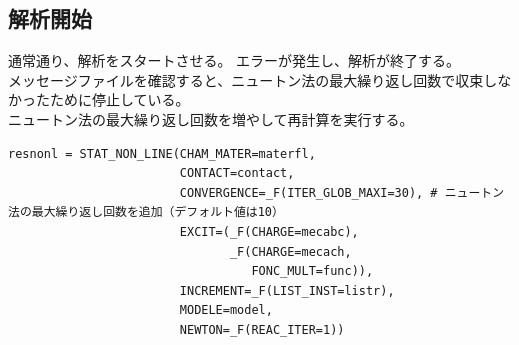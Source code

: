 \documentclass[a4j,11pt,twoside,openany,dvipdfmx]{jsarticle}
\begin{document}
\subsection{解析開始}
通常通り、解析をスタートさせる。
エラーが発生し、解析が終了する。\\
メッセージファイルを確認すると、ニュートン法の最大繰り返し回数で収束しなかったために停止している。\\
ニュートン法の最大繰り返し回数を増やして再計算を実行する。
\begin{lstlisting}[caption=非線形解析を修正,label=STAT_NON_LINE2]
resnonl = STAT_NON_LINE(CHAM_MATER=materfl,
                        CONTACT=contact,
                        CONVERGENCE=_F(ITER_GLOB_MAXI=30), # ニュートン法の最大繰り返し回数を追加（デフォルト値は10）
                        EXCIT=(_F(CHARGE=mecabc),
                               _F(CHARGE=mecach,
                                  FONC_MULT=func)),
                        INCREMENT=_F(LIST_INST=listr),
                        MODELE=model,
                        NEWTON=_F(REAC_ITER=1))
\end{lstlisting}
\end{document}
